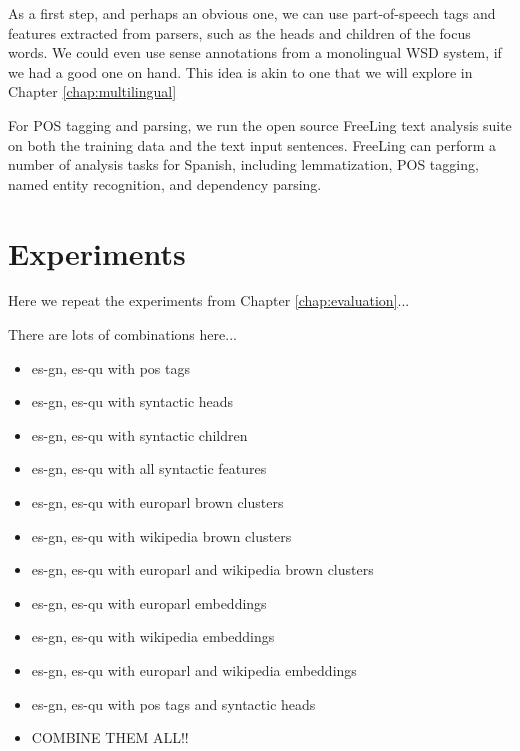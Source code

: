 As a first step, and perhaps an obvious one, we can use part-of-speech tags and
features extracted from parsers, such as the heads and children of the focus
words.
We could even use sense annotations from a monolingual WSD system, if we had a
good one on hand. This idea is akin to one that we will explore in Chapter
\ref{chap:multilingual}

For POS tagging and parsing, we run the open source FreeLing text analysis
suite \cite{padro12} on both the training data and the text input sentences.
FreeLing can perform a number of analysis tasks for Spanish, including
lemmatization, POS tagging, named entity recognition, and dependency parsing.

\section{Experiments}
Here we repeat the experiments from Chapter \ref{chap:evaluation}...

There are lots of combinations here...

\begin{itemize}
  \item es-gn, es-qu with pos tags
  \item es-gn, es-qu with syntactic heads
  \item es-gn, es-qu with syntactic children
  \item es-gn, es-qu with all syntactic features
\end{itemize}

\begin{itemize}
  \item es-gn, es-qu with europarl brown clusters
  \item es-gn, es-qu with wikipedia brown clusters
  \item es-gn, es-qu with europarl and wikipedia brown clusters
\end{itemize}

\begin{itemize}
  \item es-gn, es-qu with europarl embeddings
  \item es-gn, es-qu with wikipedia embeddings
  \item es-gn, es-qu with europarl and wikipedia embeddings
  \item es-gn, es-qu with pos tags and syntactic heads
\end{itemize}

\begin{itemize}
  \item COMBINE THEM ALL!!
\end{itemize}
